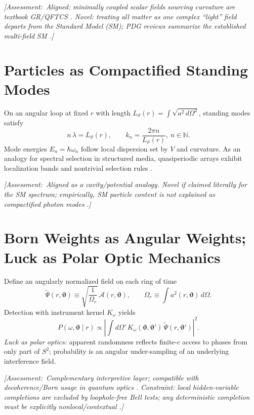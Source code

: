 \documentclass[reprint,amsmath,amssymb,aps]{revtex4-2}
\newcommand{\A}{\mathcal{A}}                   %
\newcommand{\ang}{\vartheta}                   %
\newcommand{\angb}{\boldsymbol{\vartheta}}     %
\newcommand{\Assessment}[1]{\par\smallskip\noindent\textit{\color{blue}[Assessment:\ #1]}\par\smallskip}
\begin{document}
\Assessment{Aligned: minimally coupled scalar fields sourcing curvature are textbook GR/QFTCS \cite{BirrellDavies,ParkerToms}. Novel: treating \emph{all} matter as one complex ``light'' field departs from the Standard Model (SM); PDG reviews summarize the established multi-field SM \cite{PDG2024}.}

\section{Particles as Compactified Standing Modes}
On an angular loop at fixed $r$ with length $L_\ang(r)=\int\sqrt{a^2\,d\Omega^2}$, standing modes satisfy
\begin{equation}
  n\,\lambda = L_\ang(r),\qquad k_n=\frac{2\pi n}{L_\ang(r)},\ n\in\mathbb{N}.
  \label{eq:quantization}
\end{equation}
Mode energies $E_n=\hbar\omega_n$ follow local dispersion set by $V$ and curvature. As an analogy for spectral selection in structured media, quasiperiodic arrays exhibit localization bands and nontrivial selection rules \cite{WahlstromChao1988}.

\Assessment{Aligned as a cavity/potential analogy. Novel if claimed literally for the SM spectrum; empirically, SM particle content \emph{is not} explained as compactified photon modes \cite{PDG2024}.}

\section{Born Weights as Angular Weights; Luck as Polar Optic Mechanics}
Define an angularly normalized field on each ring of time
\begin{equation}
  \tilde{\Psi}(r,\angb) \equiv \sqrt{\frac{1}{\Omega_r}}\,\A(r,\angb),\qquad
  \Omega_r\equiv\int a^2(r,\angb)\,d\Omega.
  \label{eq:polar-psi}
\end{equation}
Detection with instrument kernel $K_\omega$ yields
\begin{equation}
  P(\omega,\angb\mid r)\propto\left|\int d\Omega'\,K_\omega(\angb,\angb')\,\tilde{\Psi}(r,\angb')\right|^2.
\end{equation}
\emph{Luck as polar optics:} apparent randomness reflects finite-$c$ access to phases from only part of $S^2$; probability is an angular under-sampling of an underlying interference field.

\Assessment{Complementary interpretive layer; compatible with decoherence/Born usage in quantum optics \cite{MandelWolf1995}. Constraint: local hidden-variable completions are excluded by loophole-free Bell tests; any deterministic completion must be explicitly nonlocal/contextual \cite{Hensen2015,Giustina2015,Shalm2015,Bohm1952}.}
\end{document}
